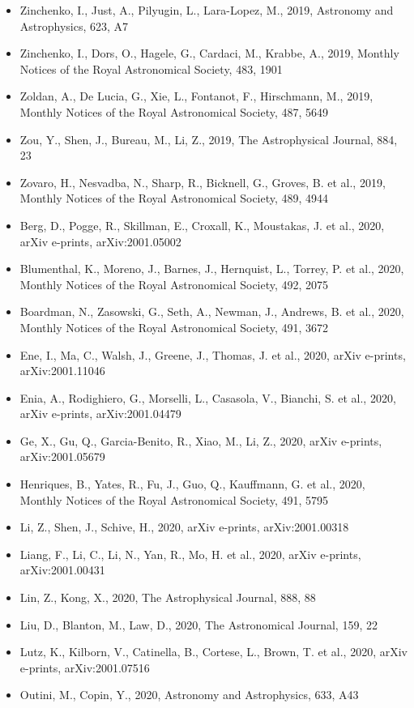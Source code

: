 \documentclass{letter}
\begin{document}
\begin{enumerate}
\begin{itemize}
\item Zinchenko, I., Just, A., Pilyugin, L., Lara-Lopez, M., 2019, Astronomy and Astrophysics, 623, A7
\item Zinchenko, I., Dors, O., Hagele, G., Cardaci, M., Krabbe, A., 2019, Monthly Notices of the Royal Astronomical Society, 483, 1901
\item Zoldan, A., De Lucia, G., Xie, L., Fontanot, F., Hirschmann, M., 2019, Monthly Notices of the Royal Astronomical Society, 487, 5649
\item Zou, Y., Shen, J., Bureau, M., Li, Z., 2019, The Astrophysical Journal, 884, 23
\item Zovaro, H., Nesvadba, N., Sharp, R., Bicknell, G., Groves, B. et al., 2019, Monthly Notices of the Royal Astronomical Society, 489, 4944
\item Berg, D., Pogge, R., Skillman, E., Croxall, K., Moustakas, J. et al., 2020, arXiv e-prints, arXiv:2001.05002
\item Blumenthal, K., Moreno, J., Barnes, J., Hernquist, L., Torrey, P. et al., 2020, Monthly Notices of the Royal Astronomical Society, 492, 2075
\item Boardman, N., Zasowski, G., Seth, A., Newman, J., Andrews, B. et al., 2020, Monthly Notices of the Royal Astronomical Society, 491, 3672
\item Ene, I., Ma, C., Walsh, J., Greene, J., Thomas, J. et al., 2020, arXiv e-prints, arXiv:2001.11046
\item Enia, A., Rodighiero, G., Morselli, L., Casasola, V., Bianchi, S. et al., 2020, arXiv e-prints, arXiv:2001.04479
\item Ge, X., Gu, Q., Garcia-Benito, R., Xiao, M., Li, Z., 2020, arXiv e-prints, arXiv:2001.05679
\item Henriques, B., Yates, R., Fu, J., Guo, Q., Kauffmann, G. et al., 2020, Monthly Notices of the Royal Astronomical Society, 491, 5795
\item Li, Z., Shen, J., Schive, H., 2020, arXiv e-prints, arXiv:2001.00318
\item Liang, F., Li, C., Li, N., Yan, R., Mo, H. et al., 2020, arXiv e-prints, arXiv:2001.00431
\item Lin, Z., Kong, X., 2020, The Astrophysical Journal, 888, 88
\item Liu, D., Blanton, M., Law, D., 2020, The Astronomical Journal, 159, 22
\item Lutz, K., Kilborn, V., Catinella, B., Cortese, L., Brown, T. et al., 2020, arXiv e-prints, arXiv:2001.07516
\item Outini, M., Copin, Y., 2020, Astronomy and Astrophysics, 633, A43

\end{itemize}
\end{enumerate}
\end{document}
